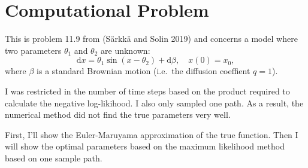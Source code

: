 \documentclass[]{article}
\begin{document}
\hypertarget{computational-problem}{%
\section{Computational Problem}\label{computational-problem}}

This is problem 11.9 from (Särkkä and Solin 2019) and concerns a model
where two parameters \(\theta_1\) and \(\theta_2\) are unknown:
\begin{equation}
\mathrm{d}x = \theta_1 \sin{\left( x - \theta_2 \right)} + \mathrm{d}\beta, \quad x(0) = x_0,
\end{equation} where \(\beta\) is a standard Brownian motion (i.e.~the
diffusion coeffient \(q=1\)).

I was restricted in the number of time steps based on the product
required to calculate the negative log-likihood. I also only sampled one
path. As a result, the numerical method did not find the true parameters
very well.

First, I'll show the Euler-Maruyama approximation of the true function.
Then I will show the optimal parameters based on the maximum likelihood
method based on one sample path.
\end{document}
